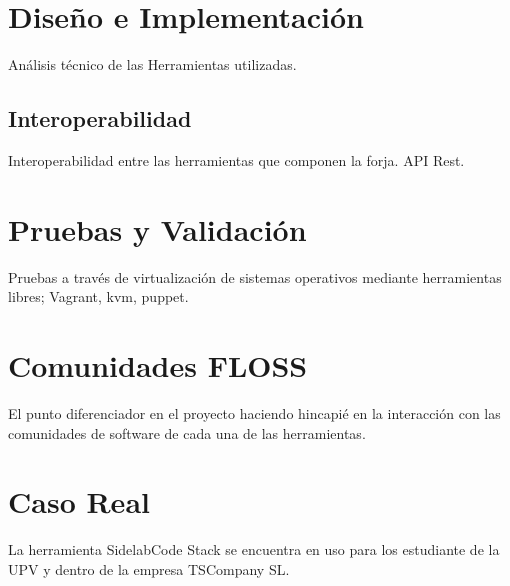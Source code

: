 \documentclass[11pt]{scrartcl}
\begin{document}


\section{Dise\~no e Implementaci\'on}
\label{sec:diseno}

\par Análisis técnico de las Herramientas utilizadas.


\subsection{Interoperabilidad}
\label{sub:interoperabilidad}

\par Interoperabilidad entre las herramientas que componen la forja. API Rest.



\section{Pruebas y Validaci\'on}
\label{sec:pruebas}

\par Pruebas a través de virtualizaci\'on de sistemas operativos mediante herramientas libres; Vagrant, kvm, puppet.


\section{Comunidades FLOSS}
\label{sec:comunidades}

\par El punto diferenciador en el proyecto haciendo hincapi\'e en la interacci\'on con las comunidades de software de cada una de las herramientas.


\section{Caso Real}
\label{sec:casoreal}

\par La herramienta SidelabCode Stack se encuentra en uso para los estudiante de la UPV y dentro de la empresa TSCompany SL.
\end{document}
